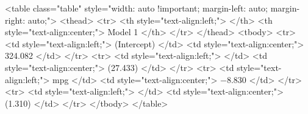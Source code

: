 <table class="table" style="width: auto !important; margin-left: auto; margin-right: auto;">
 <thead>
  <tr>
   <th style="text-align:left;">   </th>
   <th style="text-align:center;"> Model 1 </th>
  </tr>
 </thead>
<tbody>
  <tr>
   <td style="text-align:left;"> (Intercept) </td>
   <td style="text-align:center;"> 324.082 </td>
  </tr>
  <tr>
   <td style="text-align:left;">  </td>
   <td style="text-align:center;"> (27.433) </td>
  </tr>
  <tr>
   <td style="text-align:left;"> mpg </td>
   <td style="text-align:center;"> −8.830 </td>
  </tr>
  <tr>
   <td style="text-align:left;">  </td>
   <td style="text-align:center;"> (1.310) </td>
  </tr>
</tbody>
</table>
